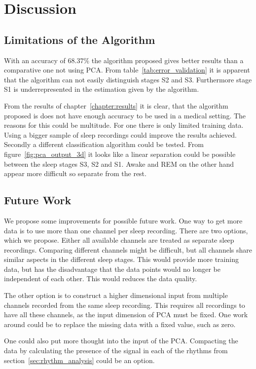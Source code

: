 \chapter{Discussion}
\label{chapter:discussion}

\section{Limitations of the Algorithm}

With an accuracy of $68.37\%$ the algorithm proposed gives better results than a comparative one not using PCA. From table~\ref{tab:error_validation} it is apparent that the algorithm can not easily distinguish stages S2 and S3. Furthermore stage S1 is underrepresented in the estimation given by the algorithm.

From the results of chapter~\ref{chapter:results} it is clear, that the algorithm proposed is does not have enough accuracy to be used in a medical setting. The reasons for this could be multitude. For one there is only limited training data. Using a bigger sample of sleep recordings could improve the results achieved. Secondly a different classification algorithm could be tested. From figure~\ref{fig:pca_output_3d} it looks like a linear separation could be possible between the sleep stages S3, S2 and S1. Awake and REM on the other hand appear more difficult so separate from the rest.

\section{Future Work}
We propose some improvements for possible future work. One way to get more data is to use more than one channel per sleep recording. There are two options, which we propose. Either all available channels are treated as separate sleep recordings. Comparing different channels might be difficult, but all channels share similar aspects in the different sleep stages. This would provide more training data, but has the disadvantage that the data points would no longer be independent of each other. This would reduces the data quality.

The other option is to construct a higher dimensional input from multiple channels recorded from the same sleep recording. This requires all recordings to have all these channels, as the input dimension of PCA must be fixed. One work around could be to replace the missing data with a fixed value, such as zero.

One could also put more thought into the input of the PCA. Compacting the data by calculating the presence of the signal in each of the rhythms from section~\ref{sec:rhythm_analysis} could be an option.

